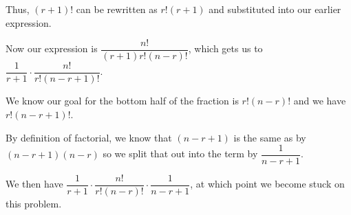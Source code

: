 \documentclass[12pt]{article}
\begin{document}
\begin{enumerate}
Thus, $(r+1)!$ can be rewritten as $r!(r +1)$ and substituted into our earlier expression.

Now our expression is $\dfrac{n!}{(r+1)r!(n - r)!}$, which gets us to $\dfrac{1}{r+1} \cdot
\dfrac{n!}{r!(n - r + 1)! }$.

We know our goal for the bottom half of the fraction is $r!(n-r)!$ and we have $r!(n - r + 1)!$.

By definition of factorial, we know that $(n - r + 1)$ is the same as  by $(n - r + 1)(n -r)$ so we
split that out into the term by $\dfrac{1}{n-r+1}$.

We then have $\dfrac{1}{r+1} \cdot \dfrac{n!}{r!(n - r)! } \cdot \dfrac{1}{n-r+1}$, at which point we become
stuck on this problem.

\end{enumerate}
\end{document}
